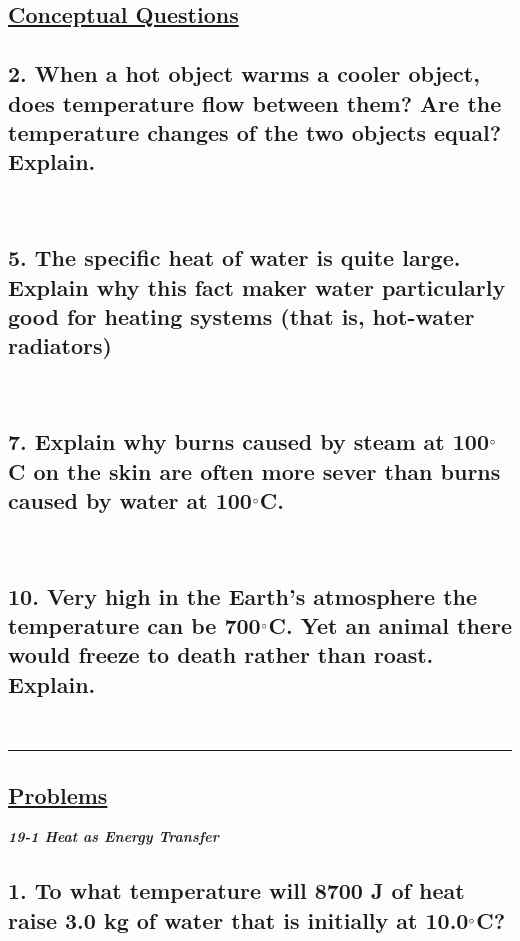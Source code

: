 \documentclass{article}
\begin{document}
\begin{center}
    \section*{\textbf{\underline {Conceptual Questions}}}
\end{center}

\subsection*{2. When a hot object warms a cooler object, does temperature flow between them? Are the temperature changes of the two objects equal? Explain.} \\

\subsection*{5. The specific heat of water is quite large. Explain why this fact maker water particularly good for heating systems (that is, hot-water radiators)} \\

\subsection*{7. Explain why burns caused by steam at 100$\degree$C on the skin are often more sever than burns caused by water at 100$\degree$C.} \\

\subsection*{10. Very high in the Earth's atmosphere the temperature can be 700$\degree$C. Yet an animal there would freeze to death rather than roast. Explain.} \\
\hrule \vspace{2em}
\begin{center}
    \section*{\textbf{\underline {Problems}}}
\end{center}
\large{\textbf{\textit{19-1 Heat as Energy Transfer}}}

\subsection*{1. To what temperature will 8700 J of heat raise 3.0 kg of water that is initially at 10.0$\degree$C?}
\end{document}
